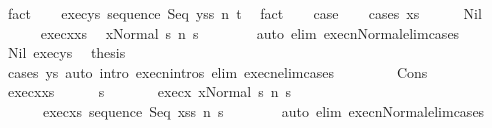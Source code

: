 \begin{isabellebody}
\ fact\isanewline
\ \ \isamarkupfalse%
\ exec{\isacharunderscore}ys{\isacharcolon}\ {\isachardoublequoteopen}{\isasymGamma}{\isasymturnstile}{\isasymlangle}sequence\ Seq\ ys{\isacharcomma}s{\isacharprime}{\isasymrangle}\ {\isacharequal}n{\isasymRightarrow}\ t{\isachardoublequoteclose}\ \isamarkupfalse%
\ fact\isanewline
\ \ \isamarkupfalse%
\ {\isacharquery}case\isanewline
\ \ \isamarkupfalse%
\ {\isacharparenleft}cases\ xs{\isacharparenright}\isanewline
\ \ \ \ \isamarkupfalse%
\ Nil\isanewline
\ \ \ \ \isamarkupfalse%
\ exec{\isacharunderscore}x{\isacharunderscore}xs\ \isamarkupfalse%
\ {\isachardoublequoteopen}{\isasymGamma}{\isasymturnstile}{\isasymlangle}x{\isacharcomma}Normal\ s{\isasymrangle}\ {\isacharequal}n{\isasymRightarrow}\ s{\isacharprime}{\isachardoublequoteclose}\isanewline
\ \ \ \ \ \ \isamarkupfalse%
\ {\isacharparenleft}auto\ elim{\isacharcolon}\ execn{\isacharunderscore}Normal{\isacharunderscore}elim{\isacharunderscore}cases\ {\isacharparenright}\isanewline
\ \ \ \ \isamarkupfalse%
\ Nil\ exec{\isacharunderscore}ys\ \isamarkupfalse%
\ {\isacharquery}thesis\isanewline
\ \ \ \ \ \ \isamarkupfalse%
\ {\isacharparenleft}cases\ ys{\isacharparenright}\ {\isacharparenleft}auto\ intro{\isacharcolon}\ execn{\isachardot}intros\ elim{\isacharcolon}\ execn{\isacharunderscore}elim{\isacharunderscore}cases{\isacharparenright}\isanewline
\ \ \isamarkupfalse%
\isanewline
\ \ \ \ \isamarkupfalse%
\ Cons\isanewline
\ \ \ \ \isamarkupfalse%
\ exec{\isacharunderscore}x{\isacharunderscore}xs\isanewline
\ \ \ \ \isamarkupfalse%
\ s{\isacharprime}{\isacharprime}\ \isanewline
\ \ \ \ \ \ exec{\isacharunderscore}x{\isacharcolon}\ {\isachardoublequoteopen}{\isasymGamma}{\isasymturnstile}{\isasymlangle}x{\isacharcomma}Normal\ s{\isasymrangle}\ {\isacharequal}n{\isasymRightarrow}\ s{\isacharprime}{\isacharprime}{\isachardoublequoteclose}\ \isanewline
\ \ \ \ \ \ exec{\isacharunderscore}xs{\isacharcolon}\ {\isachardoublequoteopen}{\isasymGamma}{\isasymturnstile}{\isasymlangle}sequence\ Seq\ xs{\isacharcomma}s{\isacharprime}{\isacharprime}{\isasymrangle}\ {\isacharequal}n{\isasymRightarrow}\ s{\isacharprime}{\isachardoublequoteclose}\isanewline
\ \ \ \ \ \ \isamarkupfalse%
\ {\isacharparenleft}auto\ elim{\isacharcolon}\ execn{\isacharunderscore}Normal{\isacharunderscore}elim{\isacharunderscore}cases\ {\isacharparenright}\isanewline

\end{isabellebody}
